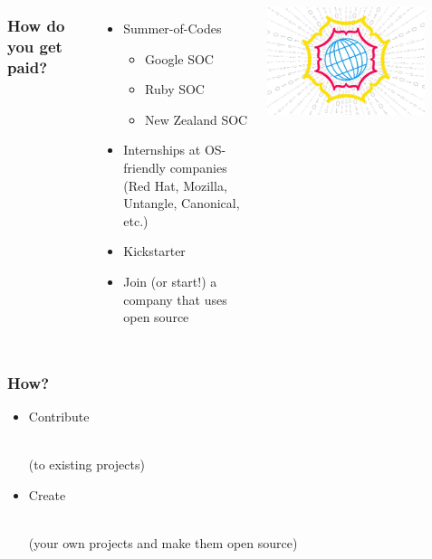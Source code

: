 \documentclass{beamer}
\begin{document}
\begin{frame}
  \begin{columns}[c]
    \frametitle{How do you get paid?}
    \begin{itemize}
    \item Summer-of-Codes
      \begin{itemize}
      \item Google SOC
      \item Ruby SOC
      \item New Zealand SOC
      \end{itemize}
    \item Internships at OS-friendly companies \\ (Red Hat, Mozilla,
      Untangle, Canonical, etc.)
    \item Kickstarter
    \item Join (or start!) a company that uses open source
    \end{itemize}
    \includegraphics[width=0.8\textwidth]{../img/soc}
  \end{columns}

\end{frame}

\begin{frame}
  \frametitle{How?}
  \begin{itemize}
    \setlength{\itemsep}{2em}
  \item \begin{LARGE} \textcolor{beamer@mygrey}{Contribute} \end{LARGE} \\ \textcolor{beamer@mygrey}{(to existing projects)}
  \item \begin{LARGE} \textcolor{beamer@myblue}{Create} \end{LARGE} \\ \textcolor{beamer@myblue}{(your own projects and make them open source)}
  \end{itemize}
\end{frame}
\end{document}
